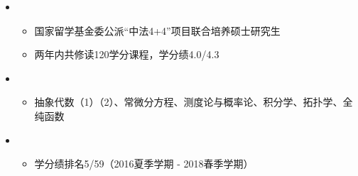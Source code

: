 	\begin{itemize}[leftmargin=*,itemsep= 0 pt,topsep = 1.2 pt, parsep = 1.2 pt]
		\item
			{\small
			\begin{itemize}
				\item{国家留学基金委公派“中法4+4”项目联合培养硕士研究生}
				\item{两年内共修读120学分课程，学分绩4.0/4.3}
			\end{itemize}
			}
		
		\item
			{\small
			\begin{itemize}
				\item{抽象代数（1）（2）、常微分方程、测度论与概率论、积分学、拓扑学、全纯函数}
			\end{itemize}
			}
		\item
			{\small
			\begin{itemize}
				\item{学分绩排名5/59（2016夏季学期 - 2018春季学期）}
			\end{itemize}
			}
	\end{itemize}